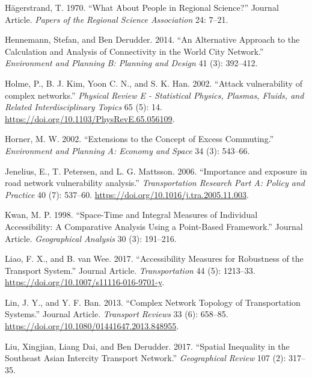 \documentclass[]{elsarticle} %
\begin{document}
\leavevmode\hypertarget{ref-Hagerstrand1970people}{}%
Hägerstrand, T. 1970. ``What About People in Regional Science?'' Journal
Article. \emph{Papers of the Regional Science Association} 24: 7--21.

\leavevmode\hypertarget{ref-hennemann2014alternative}{}%
Hennemann, Stefan, and Ben Derudder. 2014. ``An Alternative Approach to
the Calculation and Analysis of Connectivity in the World City
Network.'' \emph{Environment and Planning B: Planning and Design} 41
(3): 392--412.

\leavevmode\hypertarget{ref-Holme2002}{}%
Holme, P., B. J. Kim, Yoon C. N., and S. K. Han. 2002. ``Attack
vulnerability of complex networks.'' \emph{Physical Review E -
Statistical Physics, Plasmas, Fluids, and Related Interdisciplinary
Topics} 65 (5): 14. \url{https://doi.org/10.1103/PhysRevE.65.056109}.

\leavevmode\hypertarget{ref-Horner2002extensions}{}%
Horner, M. W. 2002. ``Extensions to the Concept of Excess Commuting.''
\emph{Environment and Planning A: Economy and Space} 34 (3): 543--66.

\leavevmode\hypertarget{ref-Jenelius2006}{}%
Jenelius, E., T. Petersen, and L. G. Mattsson. 2006. ``Importance and
exposure in road network vulnerability analysis.'' \emph{Transportation
Research Part A: Policy and Practice} 40 (7): 537--60.
\url{https://doi.org/10.1016/j.tra.2005.11.003}.

\leavevmode\hypertarget{ref-Kwan1998}{}%
Kwan, M. P. 1998. ``Space-Time and Integral Measures of Individual
Accessibility: A Comparative Analysis Using a Point-Based Framework.''
Journal Article. \emph{Geographical Analysis} 30 (3): 191--216.

\leavevmode\hypertarget{ref-Liao2017accessibility}{}%
Liao, F. X., and B. van Wee. 2017. ``Accessibility Measures for
Robustness of the Transport System.'' Journal Article.
\emph{Transportation} 44 (5): 1213--33.
\url{https://doi.org/10.1007/s11116-016-9701-y}.

\leavevmode\hypertarget{ref-Lin2013complex}{}%
Lin, J. Y., and Y. F. Ban. 2013. ``Complex Network Topology of
Transportation Systems.'' Journal Article. \emph{Transport Reviews} 33
(6): 658--85. \url{https://doi.org/10.1080/01441647.2013.848955}.

\leavevmode\hypertarget{ref-liu2017spatial}{}%
Liu, Xingjian, Liang Dai, and Ben Derudder. 2017. ``Spatial Inequality
in the Southeast Asian Intercity Transport Network.'' \emph{Geographical
Review} 107 (2): 317--35.
\end{document}
